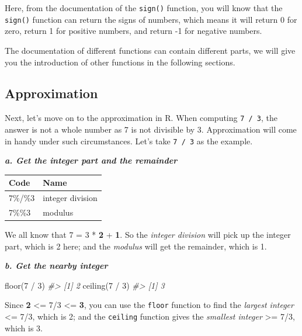 \documentclass[
]{book}
\newenvironment{Shaded}{\begin{snugshade}}{\end{snugshade}}
\newcommand{\CommentTok}[1]{\textcolor[rgb]{0.56,0.35,0.01}{\textit{#1}}}
\newcommand{\DecValTok}[1]{\textcolor[rgb]{0.00,0.00,0.81}{#1}}
\newcommand{\FunctionTok}[1]{\textcolor[rgb]{0.00,0.00,0.00}{#1}}
\newcommand{\NormalTok}[1]{#1}
\newcommand{\SpecialCharTok}[1]{\textcolor[rgb]{0.00,0.00,0.00}{#1}}
\begin{document}
Here, from the documentation of the \texttt{sign()} function, you will know that the \texttt{sign()} function can return the signs of numbers, which means it will return 0 for zero, return 1 for positive numbers, and return -1 for negative numbers.

The documentation of different functions can contain different parts, we will give you the introduction of other functions in the following sections.

\hypertarget{approximation}{%
\subsection{Approximation}\label{approximation}}

Next, let's move on to the approximation in R. When computing \texttt{7\ /\ 3}, the answer is not a whole number as 7 is not divisible by 3. Approximation will come in handy under such circumstances. Let's take \texttt{7\ /\ 3} as the example.

\textbf{\emph{a. Get the integer part and the remainder}}

\begin{tabular}{l|l}
\hline
Code & Name\\
\hline
7\%/\%3 & integer division\\
\hline
7\%\%3 & modulus\\
\hline
\end{tabular}

We all know that 7 = 3 * \textbf{2} + \textbf{1}. So the \emph{integer division} will pick up the integer part, which is 2 here; and the \emph{modulus} will get the remainder, which is 1.

\textbf{\emph{b. Get the nearby integer}}

\begin{Shaded}
\begin{Highlighting}[]
\FunctionTok{floor}\NormalTok{(}\DecValTok{7} \SpecialCharTok{/} \DecValTok{3}\NormalTok{)   }
\CommentTok{\#\textgreater{} [1] 2}
\FunctionTok{ceiling}\NormalTok{(}\DecValTok{7} \SpecialCharTok{/} \DecValTok{3}\NormalTok{) }
\CommentTok{\#\textgreater{} [1] 3}
\end{Highlighting}
\end{Shaded}

Since \textbf{2} \textless= 7/3 \textless= \textbf{3}, you can use the \texttt{floor} function to find the \emph{largest integer} \textless= 7/3, which is 2; and the \texttt{ceiling} function gives the \emph{smallest integer} \textgreater= 7/3, which is 3.
\end{document}
